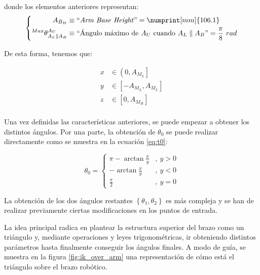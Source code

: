 \begin{itemize}
          donde los elementos anteriores representan:
          \begin{equation*}
              \left\{\begin{aligned}
                  A_{B_H}                                & \equiv \text{``\textit{Arm Base Height}''} = \numprint[mm]{106.1}                       \\
                  ^{Max}\theta^{A_U}_{A_L \parallel A_B} & \equiv \text{``Ángulo máximo de $A_U$ cuando $A_L \parallel A_B$''} = \frac{\pi}{8}~rad \\
              \end{aligned}
              \right.
          \end{equation*}
\end{itemize}

De esta forma, tenemos que:

\begin{align*}
    x & \in \left(0, A_{M_L}\right]        \\
    y & \in \left[-A_{M_L}, A_{M_L}\right] \\
    z & \in \left[0, A_{M_H}\right]        \\
\end{align*}

Una vez definidas las características anteriores, se puede empezar a obtener los distintos
ángulos. Por una parte, la obtención de $\theta_0$ se puede realizar directamente como
se muestra en la ecuación \ref{eq:t0}:

\begin{equation}\label{eq:t0}
    \theta_0 = \left\{\begin{aligned}
        \pi - \arctan{\frac{x}{y}} & ,~y > 0 \\
        - \arctan{\frac{x}{y}}     & ,~y < 0 \\
        \frac{\pi}{2}              & ,~y = 0
    \end{aligned}
    \right.
\end{equation}

La obtención de los dos ángulos restantes $\left\{\theta_1, \theta_2\right\}$ es más
compleja y se han de realizar previamente ciertas modificaciones en los puntos de entrada.

La idea principal radica en plantear la estructura superior del brazo como un triángulo
y, mediante operaciones y leyes trigonométricas, ir obteniendo distintos parámetros hasta
finalmente conseguir los ángulos finales. A modo de guía, se muestra en la figura
\ref{fig:ik_over_arm} una representación de cómo está el triángulo sobre el brazo
robótico.


